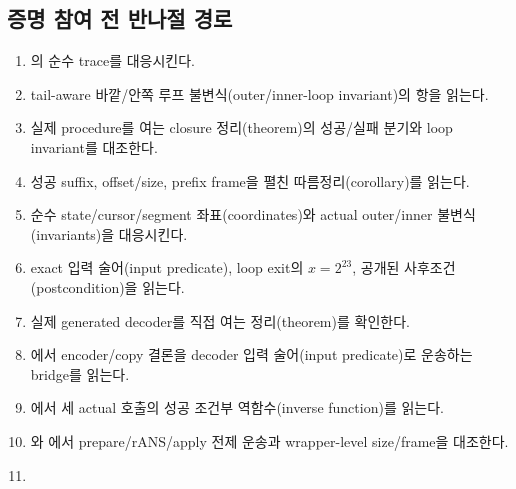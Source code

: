 \subsection{증명 참여 전 반나절 경로}

\begin{enumerate}
  \item {}\newline
        의 순수 trace를 대응시킨다.
  \item {}\newline
        tail-aware 바깥/안쪽 루프 불변식(outer/inner-loop invariant)의 항을 읽는다.
  \item {}\newline
        실제 procedure를 여는 closure 정리(theorem)의 성공/실패 분기와
        loop invariant를 대조한다.
  \item {}\newline
        성공 suffix, offset/size, prefix frame을 펼친 따름정리(corollary)를 읽는다.
  \item {}\newline
        순수 state/cursor/segment 좌표(coordinates)와 actual outer/inner
        불변식(invariants)을 대응시킨다.
  \item {}\newline
        exact 입력 술어(input predicate), loop exit의 \(x=2^{23}\), 공개된
        사후조건(postcondition)을 읽는다.
  \item {}\newline
        실제 generated decoder를 직접 여는 정리(theorem)를 확인한다.
  \item {}에서 encoder/copy 결론을
        decoder 입력 술어(input predicate)로 운송하는 bridge를 읽는다.
  \item {}에서 세 actual 호출의
        성공 조건부 역함수(inverse function)를 읽는다.
  \item {}\newline
        와
        에서 prepare/rANS/apply 전제 운송과
        wrapper-level size/frame을 대조한다.
  \item {}\newline

\end{enumerate}

